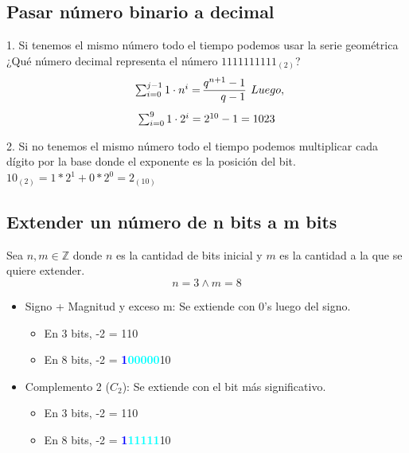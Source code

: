\documentclass[10pt,a4paper]{article}
\begin{document}
\subsection*{Pasar número binario a decimal}
1. Si tenemos el mismo número todo el tiempo podemos usar la serie geométrica \\

¿Qué número decimal representa el número \(1111111111_{(2)}\)?
\[
\begin{array}{l}
\sum_{i=0}^{j-1} 1 \cdot n^i = \begin{array}{@{} r @{}}
    q^{n+1} - 1 \\
    \hline
    q-1
 \end{array}
\end{array}
Luego, 
\]
\[
\begin{array}{l}
\sum_{i=0}^{9} 1 \cdot 2^i = \begin{array}{@{} r @{}}
    2^{10} - 1 = 1023 \\
 \end{array}
\end{array}
\]

2. Si no tenemos el mismo número todo el tiempo podemos multiplicar cada dígito por la base donde el exponente es la posición del bit. \\

\(10_{(2)} = 1 \ast 2^{1} + 0 \ast 2^{0} = 2_{(10)} \)

\subsection*{Extender un número de n bits a m bits}
Sea \( n, m \in \mathbb{Z} \) donde \(n\) es la cantidad de bits inicial y \(m\) es la cantidad a la que se quiere extender.
\[n = 3 \land m = 8\]

\begin{itemize}
    \item Signo + Magnitud y exceso m: Se extiende con 0's luego del signo.
    \begin{itemize}
        \item En 3 bits, -2 = 110
        \item En 8 bits, -2 = \textcolor{blue}{\textbf{1}}\textcolor{cyan}{\textbf{00000}}10
    \end{itemize}
    \item Complemento 2 (\(C_{2}\)): Se extiende con el bit más significativo.
    \begin{itemize}
        \item En 3 bits, -2 = 110
        \item En 8 bits, -2 = \textcolor{blue}{\textbf{1}}\textcolor{cyan}{\textbf{11111}}10
    \end{itemize}
\end{itemize} 
\end{document}
